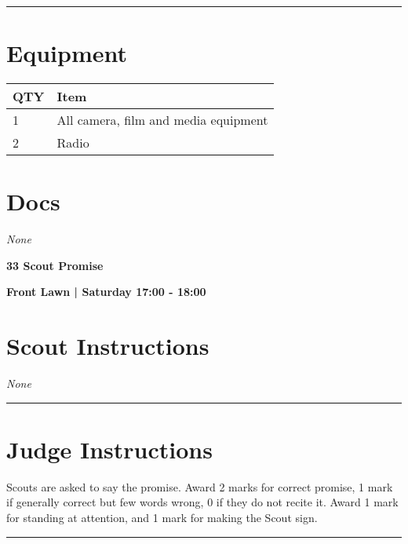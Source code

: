 \documentclass[10pt]{article}
\newcommand{\newtitle}[1]{\begin{center}{\Huge\bfseries #1 }\\ \vspace{5mm}\end{center}}
\newcommand{\newsubtitle}[1]{\begin{center}{\color{grey}\Large\bfseries #1 }\\ \vspace{5mm}\end{center}}
\begin{document}
			\vspace{0.5cm}
	\hrule
	\vspace{0.5cm}

	\begin{multicols}{2}

		\section*{\faWrench \: Equipment}

		
	\begin{center}
			\begin{tabular}{p{2cm}p{4cm}}


				\textbf{QTY} & \textbf{Item} \\\toprule
												1&All camera, film and media equipment\\\midrule
												2&Radio\\\midrule
								\end{tabular}

			\end{center}

		
		\vfill\null
		\columnbreak

			\section*{\faFile \: Docs}
		 	\textit{None}
	

		\vfill\null

		\end{multicols}



	\vspace{1cm}


	\clearpage
		\newtitle{33 Scout Promise }
	\newsubtitle{Front Lawn | Saturday 17:00 - 18:00}
		\setcounter{section}{32}
	\section*{Scout Instructions}
		\textit{None}
	
	\vspace{0.5cm}
	\hrule
	\vspace{0.5cm}

		\section*{Judge Instructions}
		Scouts are asked to say the promise. Award 2 marks for correct promise, 1 mark if generally correct but few words wrong, 0 if they do not recite it. Award 1 mark for standing at attention, and 1 mark for making the Scout sign.
\vspace{0.5cm}
	\hrule
	\vspace{0.5cm}
\end{document}
